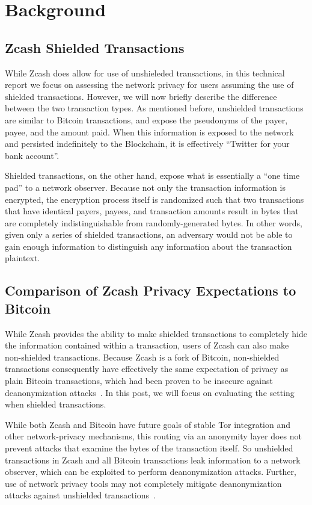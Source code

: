 \documentclass{article}
\begin{document}
\section{Background} \label{background}

\subsection{Zcash Shielded Transactions}
\label{shielded}

While Zcash does allow for use of unshieleded transactions, in this technical
report we focus on assessing the network privacy for users assuming the use of shielded
transactions. However, we will now briefly describe
the difference between the two transaction types.
As mentioned before, unshielded transactions are similar
to Bitcoin transactions, and expose the pseudonyms of the payer, payee, and the
amount paid. When this information is exposed to the network and persisted
indefinitely to the Blockchain, it is effectively “Twitter for your bank
account”.

Shielded transactions, on the other hand, expose what is essentially a “one
time pad” to a network observer. Because not only the transaction information
is encrypted, the encryption process itself is randomized such that two
transactions that have identical payers, payees, and transaction amounts result
in bytes that are completely indistinguishable from randomly-generated bytes.
In other words, given only a series of shielded transactions, an adversary
would not be able to gain enough information to distinguish any information
about the transaction plaintext.


\subsection{Comparison of Zcash Privacy Expectations to Bitcoin}

While Zcash provides the ability to make shielded transactions to completely
hide the information contained within a transaction, users of Zcash can also
make non-shielded transactions. Because Zcash is a fork of Bitcoin,
non-shielded transactions consequently have effectively the same expectation of
privacy as plain Bitcoin transactions, which had been proven to be insecure
against deanonymization attacks~\cite{anon-bitcoin}. In this post, we will
focus on evaluating the setting when shielded transactions.

While both Zcash and Bitcoin have future goals of
stable Tor integration and other network-privacy mechanisms, this routing via
an anonymity layer does not prevent attacks that examine the bytes of the
transaction itself. So unshielded transactions in Zcash and all Bitcoin
transactions leak information to a network observer, which can be exploited to
perform deanonymization attacks. Further, use of network privacy tools may not
completely mitigate deanonymization attacks against unshielded
transactions~\cite{JAWAHERI2020101684}.
\end{document}
